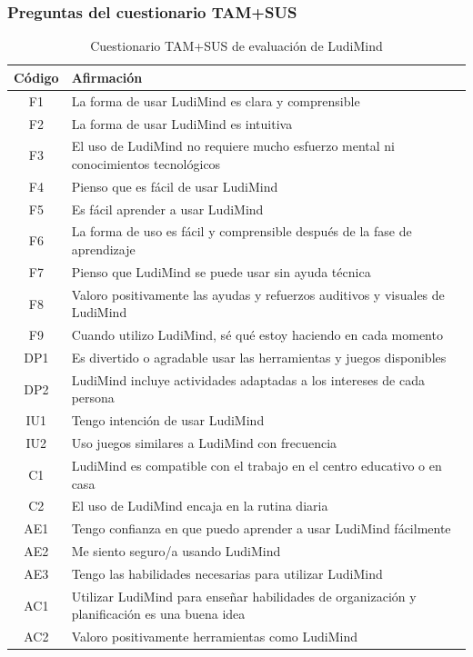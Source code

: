 \subsubsection{Preguntas del cuestionario TAM+SUS}
\begin{table}[H]
\centering
\begin{tabularx}{\textwidth}{|c|X|}
\hline
\textbf{Código} & \textbf{Afirmación} \\
\hline
F1 & La forma de usar LudiMind es clara y comprensible \\
\hline
F2 & La forma de usar LudiMind es intuitiva \\
\hline
F3 & El uso de LudiMind no requiere mucho esfuerzo mental ni conocimientos tecnológicos \\
\hline
F4 & Pienso que es fácil de usar LudiMind \\
\hline
F5 & Es fácil aprender a usar LudiMind \\
\hline
F6 & La forma de uso es fácil y comprensible después de la fase de aprendizaje \\
\hline
F7 & Pienso que LudiMind se puede usar sin ayuda técnica \\
\hline
F8 & Valoro positivamente las ayudas y refuerzos auditivos y visuales de LudiMind \\
\hline
F9 & Cuando utilizo LudiMind, sé qué estoy haciendo en cada momento \\
\hline
DP1 & Es divertido o agradable usar las herramientas y juegos disponibles \\
\hline
DP2 & LudiMind incluye actividades adaptadas a los intereses de cada persona \\
\hline
IU1 & Tengo intención de usar LudiMind \\
\hline
IU2 & Uso juegos similares a LudiMind con frecuencia \\
\hline
C1 & LudiMind es compatible con el trabajo en el centro educativo o en casa \\
\hline
C2 & El uso de LudiMind encaja en la rutina diaria \\
\hline
AE1 & Tengo confianza en que puedo aprender a usar LudiMind fácilmente \\
\hline
AE2 & Me siento seguro/a usando LudiMind \\
\hline
AE3 & Tengo las habilidades necesarias para utilizar LudiMind \\
\hline
AC1 & Utilizar LudiMind para enseñar habilidades de organización y planificación es una buena idea \\
\hline
AC2 & Valoro positivamente herramientas como LudiMind \\
\hline
\end{tabularx}
\caption{Cuestionario TAM+SUS de evaluación de LudiMind}
\label{tab:tam_ludimind}
\end{table}

